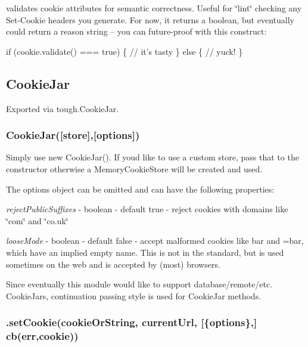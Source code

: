 validates cookie attributes for semantic correctness. Useful for \char`\"{}lint\char`\"{} checking any Set-\/\+Cookie headers you generate. For now, it returns a boolean, but eventually could return a reason string -- you can future-\/proof with this construct\+:


\begin{DoxyCode}
if (cookie.validate() === true) \{
  // it's tasty
\} else \{
  // yuck!
\}
\end{DoxyCode}


\subsection*{Cookie\+Jar}

Exported via {\ttfamily tough.\+Cookie\+Jar}.

\subsubsection*{{\ttfamily Cookie\+Jar(\mbox{[}store\mbox{]},\mbox{[}options\mbox{]})}}

Simply use {\ttfamily new Cookie\+Jar()}. If you\textquotesingle{}d like to use a custom store, pass that to the constructor otherwise a {\ttfamily Memory\+Cookie\+Store} will be created and used.

The {\ttfamily options} object can be omitted and can have the following properties\+:


\begin{DoxyItemize}
\item {\itshape reject\+Public\+Suffixes} -\/ boolean -\/ default {\ttfamily true} -\/ reject cookies with domains like \char`\"{}com\char`\"{} and \char`\"{}co.\+uk\char`\"{}
\item {\itshape loose\+Mode} -\/ boolean -\/ default {\ttfamily false} -\/ accept malformed cookies like {\ttfamily bar} and {\ttfamily =bar}, which have an implied empty name. This is not in the standard, but is used sometimes on the web and is accepted by (most) browsers.
\end{DoxyItemize}

Since eventually this module would like to support database/remote/etc. Cookie\+Jars, continuation passing style is used for Cookie\+Jar methods.

\subsubsection*{{\ttfamily .set\+Cookie(cookie\+Or\+String, current\+Url, \mbox{[}\{options\},\mbox{]} cb(err,cookie))}}

